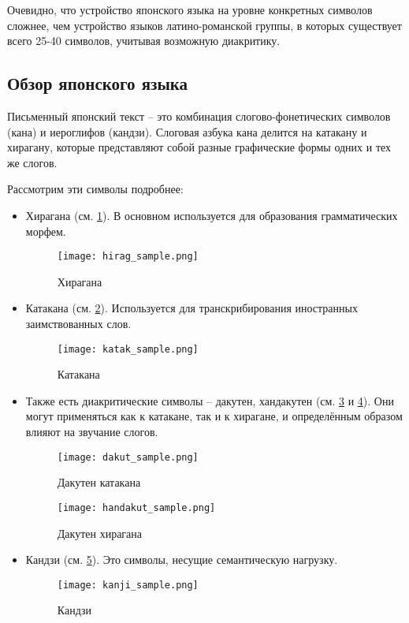 Очевидно, что устройство японского языка на уровне конкретных символов сложнее, чем устройство языков латино-романской группы, в которых существует всего 25-40 символов, учитывая возможную диакритику.

\subsection{ Обзор японского языка }
\label{sec:japanese}

Письменный японский текст -- это комбинация слогово-фонетических символов (кана) и иероглифов (кандзи).
Слоговая азбука кана делится на катакану и хирагану, которые представляют собой разные графические формы одних и тех же слогов.

Рассмотрим эти символы подробнее:

\begin{itemize}
	\item Хирагана (см. \cref{fig:hirag_sample}). В основном используется для образования грамматических морфем.
	\begin{figure}[H]
		\centering
		\texttt{[image: hirag\_sample.png]}
		\caption{Хирагана}
		\label{fig:hirag_sample}
	\end{figure}
	
	\item Катакана (см. \cref{fig:katak_sample}). Используется для транскрибирования иностранных заимствованных слов.
	\begin{figure}[H]
		\centering
		\texttt{[image: katak\_sample.png]}
		\caption{Катакана}
		\label{fig:katak_sample}
	\end{figure}

\newpage
	\item Также есть диакритические символы -- дакутен, хандакутен (см. \cref{fig:dakut_sample_hir} и \cref{fig:dakut_sample_kat}). Они могут применяться как к катакане, так и к хирагане, и определённым образом влияют на звучание слогов.
	\begin{multicols}{2}
		
		\begin{figure}[H]
			\centering
			\texttt{[image: dakut\_sample.png]}
			\caption{Дакутен катакана}
			\label{fig:dakut_sample_hir}
		\end{figure}
		
		\begin{figure}[H]
			\centering
			\texttt{[image: handakut\_sample.png]}
			\caption{Дакутен хирагана}
			\label{fig:dakut_sample_kat}
		\end{figure}
		
	\end{multicols}
	
	\item Кандзи (см. \cref{fig:kandji_sample}). Это символы, несущие семантическую нагрузку.
	\begin{figure}[H]
		\centering
		\texttt{[image: kanji\_sample.png]}
		\caption{Кандзи}
		\label{fig:kandji_sample}
	\end{figure}
\end{itemize}

